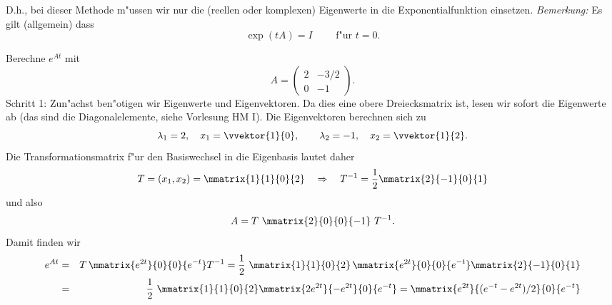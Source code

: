 D.h., bei dieser Methode m"ussen wir nur die (reellen oder komplexen) Eigenwerte
in die Exponentialfunktion einsetzen.  
{\it Bemerkung:} Es gilt (allgemein) dass
$$\exp(tA) = I \qquad\mbox{ f"ur }t=0.$$
\begin{bspX}
Berechne $e^{A t}$  mit
$$ A = \left(\begin{array}{cc}
2 & -3/2\\
0 & -1
\end{array}\right).
$$
\noindent Schritt 1: Zun"achst ben"otigen wir Eigenwerte und Eigenvektoren.
Da dies eine obere Dreiecksmatrix ist, lesen wir sofort die Eigenwerte 
ab (das sind die Diagonalelemente, siehe Vorlesung HM I).
Die Eigenvektoren berechnen sich zu
$$ \lambda_1 = 2,\quad x_1=\vvektor{1}{0}, 
\qquad \lambda_2 = -1,\quad x_2=\vvektor{1}{2}.$$
 Die Transformationsmatrix f"ur den Basiswechsel in die Eigenbasis 
lautet daher
$$ T = (x_1,x_2) = \mmatrix{1}{1}{0}{2}
\quad\Rightarrow\quad
T^{-1} = \frac{1}{2}  \mmatrix{2}{-1}{0}{1}  
$$
und also 
$$A = T\,\,
\mmatrix{2}{0}{0}{-1}
\,\,T^{-1}.$$
 Damit finden wir
\begin{eqnarray*}
e^{At} & = & T \,\mmatrix{e^{ 2t}}{0}{0}{e^{-t}} T^{-1}
= \frac 1 2 \,\, \mmatrix{1}{1}{0}{2}
\,\mmatrix{e^{ 2t}}{0}{0}{e^{-t}} 
 \mmatrix{2}{-1}{0}{1}  \\
&=& \frac 1 2 \,\, \mmatrix{1}{1}{0}{2}
 \mmatrix
{2 e^{2t}  } { -e^{2t}  }
{  0} {e^{-t}  }
=
 \mmatrix
{e^{2t}  } {( e^{-t}-e^{2t})/2  }
{  0} {e^{-t}  }
\end{eqnarray*}
\end{bspX}
\begin{auf}\cha\label{block2A4}

\end{auf}
